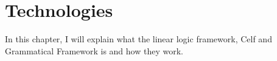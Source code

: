 \chapter{Technologies}
\label{03}

In this chapter, I will explain what the linear logic framework, Celf and Grammatical Framework is and how they work.



